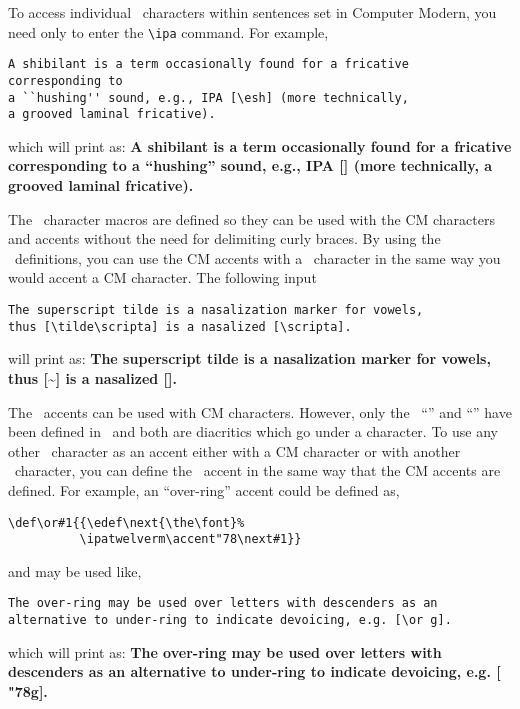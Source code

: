 To access individual \wsu\ characters within sentences set in Computer Modern,
you need only to enter the \verb?\ipa? command. For example,
\begin{verbatim}
A shibilant is a term occasionally found for a fricative
corresponding to
a ``hushing'' sound, e.g., IPA [\esh] (more technically,
a grooved laminal fricative).
\end{verbatim}
\noindent which will print as:
\vs{5pt}
{\bf
A shibilant is a term occasionally found for a fricative
corresponding to
a ``hushing'' sound, e.g., IPA [\esh] (more technically,
a grooved laminal fricative).
}
\vs{5pt}

The \ipam\ character macros are defined so they can be used with the CM
characters and accents without the need for delimiting curly braces. By using
the \ipam\
definitions, you can use the CM accents with a \wsu\ character in the
same way you would accent a CM character. The following input

\begin{verbatim}
The superscript tilde is a nasalization marker for vowels,
thus [\tilde\scripta] is a nasalized [\scripta].
\end{verbatim}
\noindent will print as:
\vs{5pt}
{\bf The superscript tilde is a nasalization marker for vowels, thus
[\~\scripta] is a nasalized [\scripta].
}
\vs{5pt}

The \wsu\ accents can be used with CM characters. However, only the \wsu\
``\dental'' and ``\underarch'' have been defined in \ipam\ and both are
diacritics which go under a character.
To use any other \wsu\ character as an accent either with a CM character or with
another \wsu\ character, you can define the \wsu\ accent
in the same way that the CM accents are defined. For example, an ``over-ring''
accent could be defined as,

\begin{verbatim}
\def\or#1{{\edef\next{\the\font}%
          \ipatwelverm\accent"78\next#1}}
\end{verbatim}
\noindent and may be used like,

\begin{verbatim}
The over-ring may be used over letters with descenders as an
alternative to under-ring to indicate devoicing, e.g. [\or g].
\end{verbatim}
\noindent which will print as:
\vs{5pt}
{\def\or#1{{\edef\next{\the\font}%
          \ipatwelverm\accent"78\next#1}}
\bf The over-ring may be used over letters with descenders as an
alternative to under-ring to indicate devoicing, e.g. [\or g].}
\vs{5pt}

